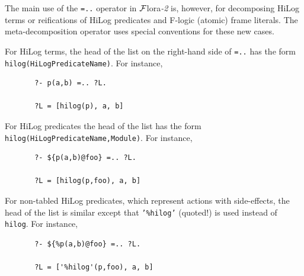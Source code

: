 \documentclass[11pt]{article}
\newcommand{\FLSYSTEM}{{\mbox{\sc ${\cal F}${lora}\rm\emph{-2}}}\xspace}
\begin{document}
The main use of the {\tt =..} operator in \FLSYSTEM is, however, for
decomposing HiLog terms or reifications of HiLog predicates and F-logic
(atomic) frame literals. The meta-decomposition operator uses special
conventions for these new cases.

For HiLog terms, the head of the list on the right-hand side of {\tt =..}
has the form {\tt hilog(HiLogPredicateName)}. For instance, 
\begin{verbatim}
       ?- p(a,b) =.. ?L.
 
       ?L = [hilog(p), a, b]
\end{verbatim}
For HiLog predicates the head of the list has the form {\tt
  hilog(HiLogPredicateName,Module)}. For instance,
\begin{verbatim}
       ?- ${p(a,b)@foo} =.. ?L.
 
       ?L = [hilog(p,foo), a, b]
\end{verbatim}
For non-tabled HiLog predicates, which represent actions with side-effects,
the head of the list is similar except that {\tt '\%hilog'} (quoted!) is 
used instead of {\tt hilog}.  For instance,
\begin{verbatim}
       ?- ${%p(a,b)@foo} =.. ?L.
 
       ?L = ['%hilog'(p,foo), a, b]
\end{verbatim}
\end{document}
